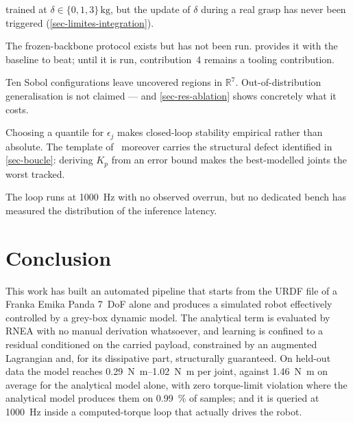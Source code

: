 \documentclass[a4paper, oneside]{article}
\newcommand{\Rset}{\ensuremath{\mathbb{R}}}
\begin{document}
\begin{description}
    trained at $\delta \in \{0,1,3\}\,\si{\kilogram}$, but the update of
    $\delta$ during a real grasp has never been triggered
    (\cref{sec-limites-integration}).
    \item[Sim-to-sim fine-tuning implemented, not validated.] The
    frozen-backbone protocol exists but has not been run. 
    provides it with the baseline to beat; until it is run, contribution~4
    remains a tooling contribution.
    \item[Spatial under-sampling.] Ten Sobol configurations leave uncovered
    regions in $\Rset^7$. Out-of-distribution generalisation is not claimed ---
    and \cref{sec-res-ablation} shows concretely what it costs.
    \item[Statistical stability.] Choosing a quantile for $\epsilon_j$ makes
    closed-loop stability empirical rather than absolute. The template
    of~\cite{liu2024} moreover carries the structural defect identified in
    \cref{sec-boucle}: deriving $K_p$ from an error bound makes the
    best-modelled joints the worst tracked.
    \item[Inference latency not measured.] The loop runs at
    \SI{1000}{\hertz} with no observed overrun, but no dedicated bench has
    measured the distribution of the inference latency.
\end{description}

\section{Conclusion}
\label{sec-conclusion}

This work has built an automated pipeline that starts from the URDF file of a
Franka Emika Panda 7~DoF alone and produces a simulated robot effectively
controlled by a grey-box dynamic model. The analytical term is evaluated by
RNEA with no manual derivation whatsoever, and learning is confined to a
residual conditioned on the carried payload, constrained by an augmented
Lagrangian and, for its dissipative part, structurally guaranteed. On held-out
data the model reaches \SIrange{0.29}{1.02}{\newton\meter} per joint, against
\SI{1.46}{\newton\meter} on average for the analytical model alone, with zero
torque-limit violation where the analytical model produces them on
\SI{0.99}{\percent} of samples; and it is queried at \SI{1000}{\hertz} inside a
computed-torque loop that actually drives the robot.
\end{document}
